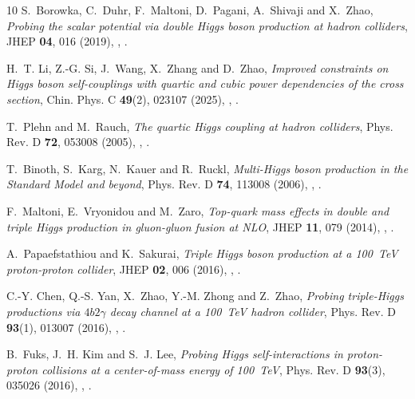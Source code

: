 \documentclass{SciPost}
\begin{document}
\begin{thebibliography}{10}
S.~Borowka, C.~Duhr, F.~Maltoni, D.~Pagani, A.~Shivaji and X.~Zhao,
\newblock \emph{{Probing the scalar potential via double Higgs boson production at hadron colliders}},
\newblock JHEP \textbf{04}, 016 (2019),
\newblock {},
\newblock {}.

H.~T. Li, Z.-G. Si, J.~Wang, X.~Zhang and D.~Zhao,
\newblock \emph{{Improved constraints on Higgs boson self-couplings with quartic and cubic power dependencies of the cross section}},
\newblock Chin. Phys. C \textbf{49}(2), 023107 (2025),
\newblock {},
\newblock {}.

T.~Plehn and M.~Rauch,
\newblock \emph{{The quartic Higgs coupling at hadron colliders}},
\newblock Phys. Rev. D \textbf{72}, 053008 (2005),
\newblock {},
\newblock {}.

T.~Binoth, S.~Karg, N.~Kauer and R.~Ruckl,
\newblock \emph{{Multi-Higgs boson production in the Standard Model and beyond}},
\newblock Phys. Rev. D \textbf{74}, 113008 (2006),
\newblock {},
\newblock {}.

F.~Maltoni, E.~Vryonidou and M.~Zaro,
\newblock \emph{{Top-quark mass effects in double and triple Higgs production in gluon-gluon fusion at NLO}},
\newblock JHEP \textbf{11}, 079 (2014),
\newblock {},
\newblock {}.

A.~Papaefstathiou and K.~Sakurai,
\newblock \emph{{Triple Higgs boson production at a 100~TeV proton-proton collider}},
\newblock JHEP \textbf{02}, 006 (2016),
\newblock {},
\newblock {}.

C.-Y. Chen, Q.-S. Yan, X.~Zhao, Y.-M. Zhong and Z.~Zhao,
\newblock \emph{{Probing triple-Higgs productions via $4b2\gamma$ decay channel at a 100~TeV hadron collider}},
\newblock Phys. Rev. D \textbf{93}(1), 013007 (2016),
\newblock {},
\newblock {}.

B.~Fuks, J.~H. Kim and S.~J. Lee,
\newblock \emph{{Probing Higgs self-interactions in proton-proton collisions at a center-of-mass energy of 100~TeV}},
\newblock Phys. Rev. D \textbf{93}(3), 035026 (2016),
\newblock {},
\newblock {}.


\end{thebibliography}
\end{document}
